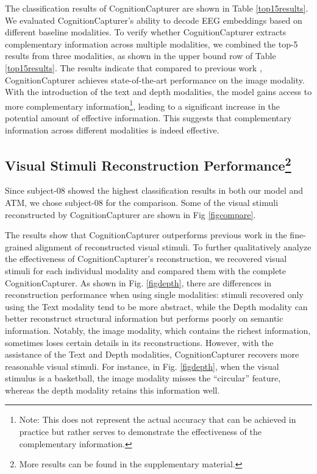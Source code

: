 \documentclass[letterpaper]{article} %
\begin{document}
The classification results of CognitionCapturer are shown in Table \ref{top15results}. We evaluated CognitionCapturer's ability to decode EEG embeddings based on different baseline modalities. To verify whether CognitionCapturer extracts complementary information across multiple modalities, we combined the top-5 results from three modalities, as shown in the upper bound row of Table \ref{top15results}. The results indicate that compared to previous work \cite{li2024visualdecodingreconstructioneeg, du2023decoding}, CognitionCapturer achieves state-of-the-art performance on the image modality. With the introduction of the text and depth modalities, the model gains access to more complementary information\footnote{Note: This does not represent the actual accuracy that can be achieved in practice but rather serves to demonstrate the effectiveness of the complementary information.}, leading to a significant increase in the potential amount of effective information. This suggests that complementary information across different modalities is indeed effective.

\subsection{Visual Stimuli Reconstruction Performance\footnote{More results can be found in the supplementary material.}}

Since subject-08 showed the highest classification results in both our model and ATM, we chose subject-08 for the comparison. Some of the visual stimuli reconstructed by CognitionCapturer are shown in Fig \ref{figcompare}. 

The results show that CognitionCapturer outperforms previous work \cite{li2024visualdecodingreconstructioneeg} in the fine-grained alignment of reconstructed visual stimuli. To further qualitatively analyze the effectiveness of CognitionCapturer's reconstruction, we recovered visual stimuli for each individual modality and compared them with the complete CognitionCapturer. As shown in Fig. \ref{figdepth}, there are differences in reconstruction performance when using single modalities: stimuli recovered only using the Text modality tend to be more abstract, while the Depth modality can better reconstruct structural information but performs poorly on semantic information. Notably, the image modality, which contains the richest information, sometimes loses certain details in its reconstructions. However, with the assistance of the Text and Depth modalities, CognitionCapturer recovers more reasonable visual stimuli. For instance, in Fig. \ref{figdepth}, when the visual stimulus is a basketball, the image modality misses the ``circular'' feature, whereas the depth modality retains this information well. 
\end{document}

